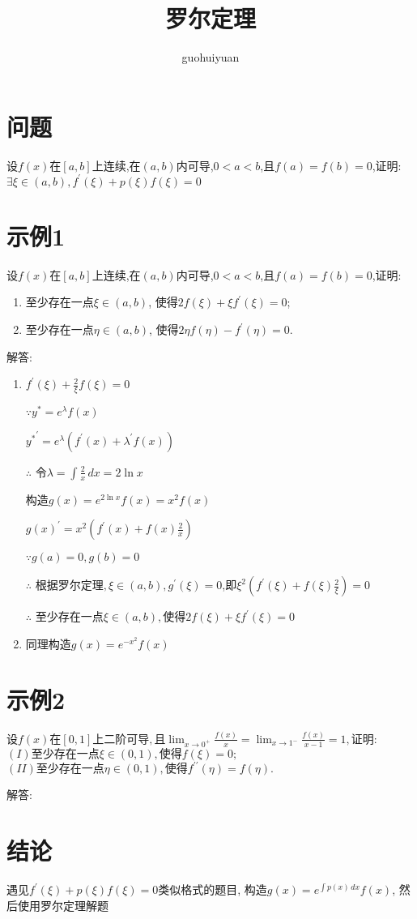 \documentclass[UTF8, 12pt]{ctexart}
\author{guohuiyuan}
\title{罗尔定理}
\date{}
\begin{document}
\renewcommand{\arraystretch}{1.5}
\maketitle
\pagestyle{empty}
\thispagestyle{empty}
\tableofcontents
\thispagestyle{empty}
\newpage

\section{问题} %
设$f(x)$在$[a,b]$上连续,在$(a,b)$内可导,$0<a<b$,且$f(a)=f(b)=0$,证明:$\exists \xi \in(a,b), f^{\prime}(\xi)+p(\xi)f(\xi)=0$

\section{示例1}
设$f(x)$在$[a,b]$上连续,在$(a,b)$内可导,$0<a<b$,且$f(a)=f(b)=0$,证明:
\begin{enumerate}
\item 至少存在一点$\xi \in(a, b)$, 使得$2 f(\xi)+\xi f^{\prime}(\xi)=0$;
\item 至少存在一点$\eta \in(a, b)$, 使得$2 \eta f(\eta)-f^{\prime}(\eta)=0$.
\end{enumerate}

解答:
\begin{enumerate}
\item 
$f^{\prime}(\xi)+ \tfrac{2}{\xi}f(\xi)=0$

$\because y^*=e^\lambda f(x) $

${y^*}^{\prime}=e^\lambda(f^{\prime}(x)+\lambda^{\prime}f(x))$

$\therefore$ 令$\lambda=\int \tfrac{2}{x}  \,dx=2\ln x$

构造$g(x)=e^{2\ln x}f(x)=x^2f(x)$

${g(x)}^{\prime}=x^2(f^{\prime}(x)+f(x)\tfrac{2}{x})$

$\because g(a)=0,g(b)=0$

$\therefore$ 根据罗尔定理$,\xi \in(a, b),g^{\prime}(\xi)=0$,即$\xi^2(f^{\prime}(\xi)+f(\xi)\tfrac{2}{\xi})=0$

$\therefore$ 至少存在一点$\xi \in(a, b), $使得$2 f(\xi)+\xi f^{\prime}(\xi)=0$

\item
同理构造$g(x)=e^{-x^2}f(x)$
\end{enumerate}

\section{示例2}
$设  f(x)  在  [0,1]  上二阶可导, 且  \lim _{x \rightarrow 0^{+}} \frac{f(x)}{x}=\lim _{x \rightarrow 1^{-}} \frac{f(x)}{x-1}=1 , 证明:$
$(I) 至少存在一点  \xi \in(0,1) , 使得  f(\xi)=0 ;$
$(II) 至少存在一点  \eta \in(0,1) , 使得  f^{\prime \prime}(\eta)=f(\eta) .$

解答:

\section{结论}
遇见$f^{\prime}(\xi)+p(\xi)f(\xi)=0$类似格式的题目, 构造$g(x)=e^{\int p(x) \,dx } f(x)$, 然后使用罗尔定理解题
\end{document}
